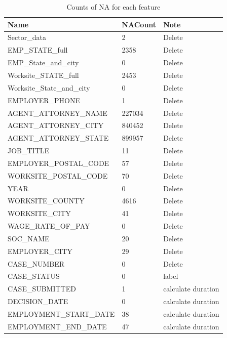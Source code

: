\documentclass{article}
\begin{document}
\begin{table}[H]
\centering
\caption{Counts of NA for each feature}
\label{data_intro}
\begin{tabular}{lll}
\hline
Name & NACount & Note\\ \hline
Sector\_data & 2 & {\color{red}Delete }\\ \hline
EMP\_STATE\_full & 2358 & {\color{red}Delete }\\ \hline
EMP\_State\_and\_city & 0 & {\color{red}Delete }\\ \hline
Worksite\_STATE\_full & 2453 & {\color{red}Delete }\\ \hline
Worksite\_State\_and\_city & 0 & {\color{red}Delete }\\ \hline
EMPLOYER\_PHONE & 1 & {\color{red}Delete }\\ \hline
AGENT\_ATTORNEY\_NAME & 227034 & {\color{red}Delete }\\ \hline
AGENT\_ATTORNEY\_CITY & 840452 & {\color{red}Delete }\\ \hline
AGENT\_ATTORNEY\_STATE & 899957 & {\color{red}Delete }\\ \hline
JOB\_TITLE & 11 & {\color{red}Delete }\\ \hline
EMPLOYER\_POSTAL\_CODE & 57 & {\color{red}Delete }\\ \hline
WORKSITE\_POSTAL\_CODE & 70 & {\color{red}Delete }\\ \hline
YEAR & 0 & {\color{red}Delete }\\ \hline
WORKSITE\_COUNTY & 4616 & {\color{red}Delete }\\ \hline
WORKSITE\_CITY & 41 & {\color{red}Delete }\\ \hline
WAGE\_RATE\_OF\_PAY & 0 & {\color{red}Delete }\\\hline
SOC\_NAME & 20 & {\color{red}Delete }\\ \hline
EMPLOYER\_CITY & 29 & {\color{red}Delete }\\ \hline
CASE\_NUMBER & 0 & {\color{red}Delete }\\ \hline
CASE\_STATUS & 0 & {\color{green}label }\\ \hline
CASE\_SUBMITTED & 1 &  {\color{blue} calculate duration }\\ \hline
DECISION\_DATE & 0 & {\color{blue} calculate duration }\\ \hline
EMPLOYMENT\_START\_DATE & 38 & {\color{blue} calculate duration }\\ \hline
EMPLOYMENT\_END\_DATE & 47 & {\color{blue} calculate duration }\\ \hline

\end{tabular}
\end{table}
\end{document}
